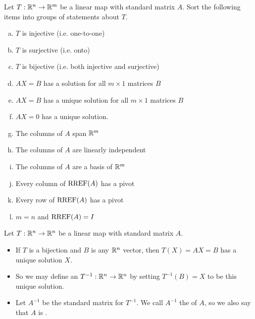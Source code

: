 \begin{applicationActivities}

\begin{activity}{15}
Let $T: \mathbb{R}^n \rightarrow \mathbb{R}^m$ be a linear map with standard matrix $A$.
Sort the following items into groups of statements about $T$.
\begin{multicols}{2}
\begin{enumerate}[(a)]
\item $T$ is injective (i.e. one-to-one)
\item $T$ is surjective (i.e. onto)
\item $T$ is bijective (i.e. both injective and surjective)
\item $AX=B$ has a solution for all $m \times 1$ matrices $B$
\item $AX=B$ has a unique solution for all $m \times 1$ matrices $B$
\item $AX=0$ has a unique solution.
\item The columns of $A$ span $\mathbb{R}^m$
\item The columns of $A$ are linearly independent
\item The columns of $A$ are a basis of $\mathbb{R}^m$
\item Every column of $\operatorname{RREF}(A)$ has a pivot
\item Every row of $\operatorname{RREF}(A)$ has a pivot
\item $m=n$ and $\operatorname{RREF}(A)=I$
\end{enumerate}
\end{multicols}
\end{activity}

\begin{definition}
  Let $T: \mathbb{R}^n \rightarrow \mathbb{R}^n$ be a linear map with standard matrix $A$.
\begin{itemize}
\item  If $T$ is a bijection and $B$ is any $\mathbb{R}^n$ vector, then $T(X)=AX=B$ has a unique solution $X$.
\item So we may define an  $T^{-1} : \mathbb{R}^n \rightarrow \mathbb{R}^n$ by setting $T^{-1}(B)=X$ to be this unique solution.
\item Let $A^{-1}$ be the standard matrix for $T^{-1}$. We call $A^{-1}$ the
 of $A$, so we also say that $A$ is .
\end{itemize}
\end{definition}



\end{applicationActivities}
